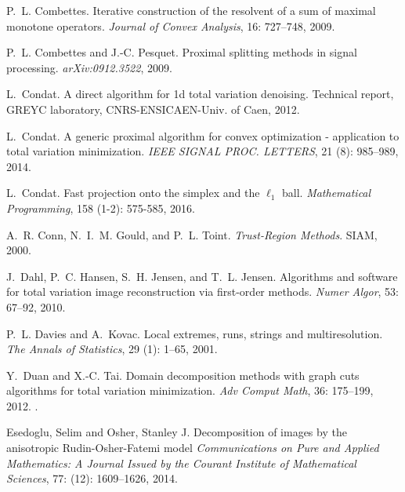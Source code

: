 \documentclass[twoside,11pt]{article}
\numberwithin{equation}{section}
\numberwithin{theorem}{section}
\begin{document}
\begin{thebibliography}{86}
P.~L. Combettes.
\newblock Iterative construction of the resolvent of a sum of maximal monotone
  operators.
\newblock \emph{Journal of Convex Analysis}, 16: 727--748, 2009.

P.~L. Combettes and J.-C. Pesquet.
\newblock Proximal splitting methods in signal processing.
\newblock \emph{arXiv:0912.3522}, 2009.

L.~Condat.
\newblock A direct algorithm for 1d total variation denoising.
\newblock Technical report, GREYC laboratory, CNRS-ENSICAEN-Univ. of Caen,
  2012.

L.~Condat.
\newblock A generic proximal algorithm for convex optimization - application to
  total variation minimization.
\newblock \emph{IEEE SIGNAL PROC. LETTERS}, 21 (8): 985--989,
  2014.

L.~Condat.
\newblock Fast projection onto the simplex and the $\ell_1$ ball.
\newblock \emph{Mathematical Programming}, 158 (1-2): 575-585, 2016.

A.~R. Conn, N.~I.~M. Gould, and P.~L. Toint.
\newblock \emph{{Trust-Region Methods}}.
\newblock SIAM, 2000.

J.~Dahl, P.~C. Hansen, S.~H. Jensen, and T.~L. Jensen.
\newblock Algorithms and software for total variation image reconstruction via
  first-order methods.
\newblock \emph{Numer Algor}, 53: 67--92, 2010.

P.~L. Davies and A.~Kovac.
\newblock Local extremes, runs, strings and multiresolution.
\newblock \emph{The Annals of Statistics}, 29 (1): 1--65,
  2001.

Y.~Duan and X.-C. Tai.
\newblock Domain decomposition methods with graph cuts algorithms for total
  variation minimization.
\newblock \emph{Adv Comput Math}, 36: 175--199, 2012.
\newblock {}.

Esedoglu, Selim and Osher, Stanley J.
\newblock Decomposition of images by the anisotropic Rudin-Osher-Fatemi model
\newblock \emph{Communications on Pure and Applied Mathematics: A Journal Issued by the Courant Institute of Mathematical Sciences}, 77: (12): 1609--1626, 2014.


\end{thebibliography}
\end{document}
